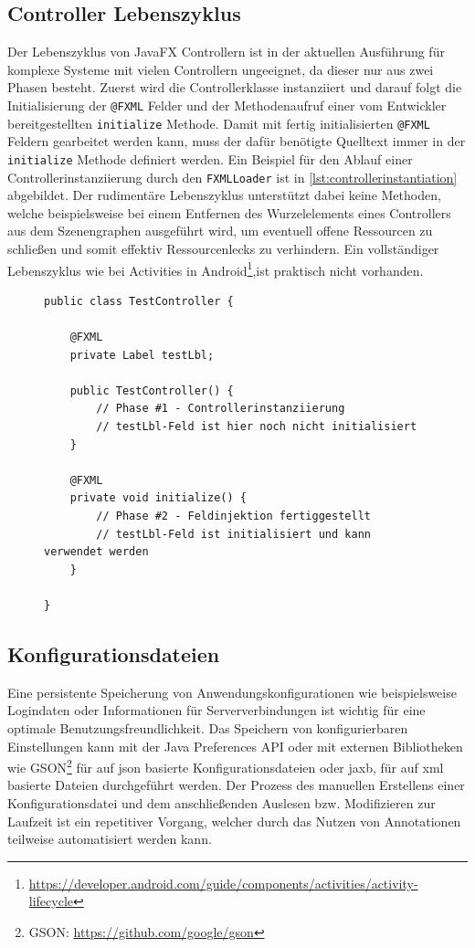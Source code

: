 \subsection{Controller Lebenszyklus}
\label{controller_lebenszyklus}
Der Lebenszyklus von JavaFX Controllern ist in der aktuellen Ausführung für komplexe Systeme mit vielen Controllern ungeeignet, da dieser nur aus zwei Phasen besteht. Zuerst wird die Controllerklasse instanziiert und darauf folgt die Initialisierung der \texttt{@FXML} Felder und der Methodenaufruf einer vom Entwickler bereitgestellten \texttt{initialize} Methode. Damit mit fertig initialisierten \texttt{@FXML} Feldern gearbeitet werden kann, muss der dafür benötigte Quelltext immer in der \texttt{initialize} Methode definiert werden. Ein Beispiel für den Ablauf einer Controllerinstanziierung durch den \texttt{FXMLLoader} ist in \autoref{lst:controllerinstantiation} abgebildet. Der rudimentäre Lebenszyklus unterstützt dabei keine Methoden, welche beispielsweise bei einem Entfernen des Wurzelelements eines Controllers aus dem Szenengraphen ausgeführt wird, um eventuell offene Ressourcen zu schließen und somit effektiv Ressourcenlecks zu verhindern. Ein vollständiger Lebenszyklus wie bei Activities in Android\footnote{\url{https://developer.android.com/guide/components/activities/activity-lifecycle}},ist praktisch nicht vorhanden.
\begin{figure}[H]
	\centering
	\begin{lstlisting}[caption=Beispiel -- Instanziierungsablauf., captionpos=b, label=lst:controllerinstantiation]
public class TestController {
	
	@FXML
	private Label testLbl;
	
	public TestController() {
		// Phase #1 - Controllerinstanziierung
		// testLbl-Feld ist hier noch nicht initialisiert
	}
	
	@FXML
	private void initialize() {
		// Phase #2 - Feldinjektion fertiggestellt
		// testLbl-Feld ist initialisiert und kann verwendet werden
	}
	
}
	\end{lstlisting}
\end{figure}
\subsection{Konfigurationsdateien}
Eine persistente Speicherung von Anwendungskonfigurationen wie beispielsweise Logindaten oder Informationen für Serververbindungen ist wichtig für eine optimale Benutzungsfreundlichkeit. Das Speichern von konfigurierbaren Einstellungen kann mit der Java Preferences API oder mit externen Bibliotheken wie GSON\footnote{GSON: \url{https://github.com/google/gson}} für auf \ac{json} basierte Konfigurationsdateien oder \ac{jaxb}, für auf \ac{xml} basierte Dateien durchgeführt werden. Der Prozess des manuellen Erstellens einer Konfigurationsdatei und dem anschließenden Auslesen bzw. Modifizieren zur Laufzeit ist ein repetitiver Vorgang, welcher durch das Nutzen von Annotationen teilweise automatisiert werden kann.
